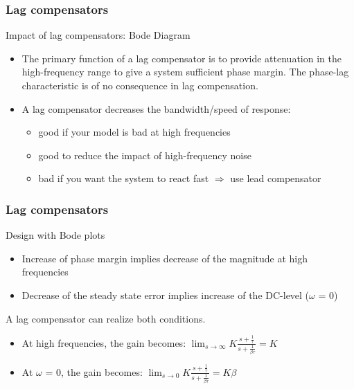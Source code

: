 \begin{frame}
	\frametitle{Lag compensators}
	\begin{block}{Impact of lag compensators: Bode Diagram}
	\begin{itemize}
	\item The primary function of a lag compensator is to provide attenuation in the high-frequency
	range to give a system sufficient phase margin. The phase-lag characteristic
	is of no consequence in lag compensation.
	\item A lag compensator decreases the bandwidth/speed of response: 
	\begin{itemize}
		\item good if your model is bad at high frequencies
		\item good to reduce the impact of high-frequency noise 
		\item bad if you want the system to react fast $\Rightarrow$ use lead compensator
	\end{itemize}
	\end{itemize}
	\end{block}
\end{frame}

		

\begin{frame}
	\frametitle{Lag compensators}
	\begin{block}{Design with Bode plots}
		\begin{itemize}
		\item Increase of phase margin implies decrease of the magnitude at high frequencies 
		\item Decrease of the steady state error implies increase of the DC-level ($\omega$ = 0)
		\end{itemize}
		A lag compensator can realize both conditions.
		\begin{itemize}
			\item At high frequencies, the gain becomes:
			$\lim_{s \to \infty} K\frac{s + \frac{1}{\tau}}{s + \frac{1}{\beta\tau}} = K$ 
			\item At $\omega$ = 0, the gain becomes: $\lim_{s \to 0} K\frac{s + \frac{1}{\tau}}{s + \frac{1}{\beta\tau}} = K\beta$
		\end{itemize}
	\end{block}
\end{frame}


